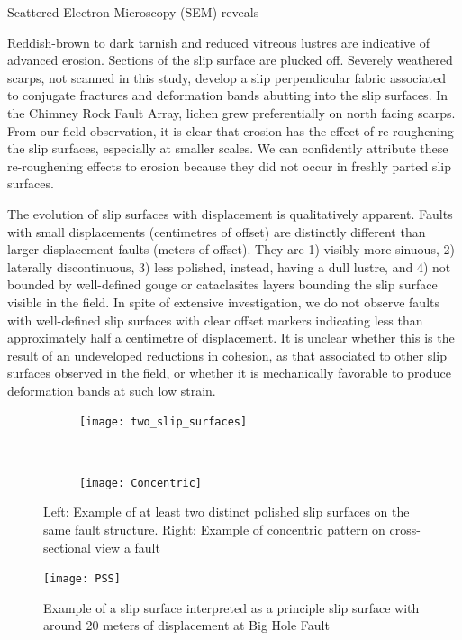 \documentclass[12pt,a4paper]{article}
\begin{document}
Scattered Electron Microscopy (SEM) reveals 

Reddish-brown to dark tarnish and reduced vitreous lustres are indicative of advanced erosion. Sections of the slip surface are plucked off. Severely weathered scarps, not scanned in this study, develop a slip perpendicular fabric associated to conjugate fractures and deformation bands abutting into the slip surfaces.  In the Chimney Rock Fault Array, lichen grew preferentially on north facing scarps. From our field observation, it is clear that erosion has the effect of re-roughening the slip surfaces, especially at smaller scales. We can confidently attribute these re-roughening effects to erosion because they did not occur in freshly parted slip surfaces.

The evolution of slip surfaces with displacement is qualitatively apparent. Faults with small displacements (centimetres of offset) are distinctly different than larger displacement faults (meters of offset). They are 1) visibly more sinuous, 2) laterally discontinuous, 3) less polished, instead, having a dull lustre, and 4) not bounded by well-defined gouge or cataclasites layers bounding the slip surface visible in the field. In spite of extensive investigation, we do not observe faults with well-defined slip surfaces with clear offset markers indicating less than approximately half a centimetre of displacement. It is unclear whether this is the result of an undeveloped reductions in cohesion, as that associated to other slip surfaces observed in the field, or whether it is mechanically favorable to produce deformation bands at such low strain.

\begin{figure}
	\centering
	\begin{subfigure}[b]{0.4\textwidth}
		\texttt{[image: two\_slip\_surfaces]}
	\end{subfigure}
	~
	\begin{subfigure}[b]{0.4\textwidth}
		\texttt{[image: Concentric]}
	\end{subfigure}
	\caption{Left: Example of at least two distinct polished slip surfaces on the same fault structure. Right: Example of concentric pattern on cross-sectional view a fault}
	\label{many_surf}
\end{figure}	

\begin{figure}
	\centering
    \texttt{[image: PSS]}
	
	\caption{Example of a slip surface interpreted as a principle slip surface with around 20 meters of displacement at Big Hole Fault}
	\label{PSS}
\end{figure}
\end{document}
